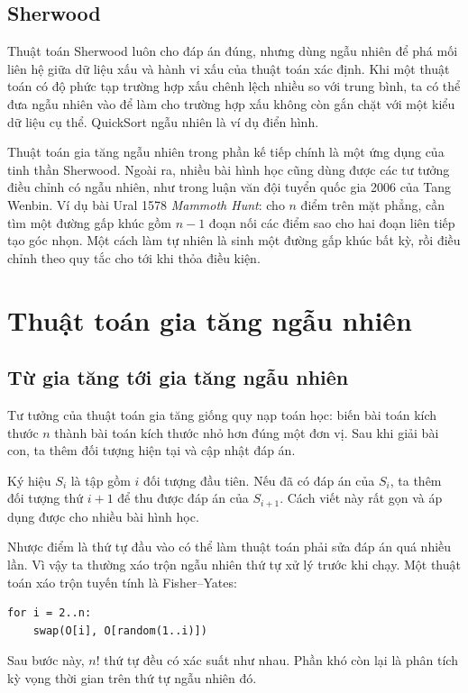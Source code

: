 \documentclass[11pt]{article}
\begin{document}
\subsection{Sherwood}

Thuật toán Sherwood luôn cho đáp án đúng, nhưng dùng ngẫu nhiên để phá mối
liên hệ giữa dữ liệu xấu và hành vi xấu của thuật toán xác định. Khi một thuật
toán có độ phức tạp trường hợp xấu chênh lệch nhiều so với trung bình, ta có
thể đưa ngẫu nhiên vào để làm cho trường hợp xấu không còn gắn chặt với một
kiểu dữ liệu cụ thể. QuickSort ngẫu nhiên là ví dụ điển hình.

Thuật toán gia tăng ngẫu nhiên trong phần kế tiếp chính là một ứng dụng của
tinh thần Sherwood. Ngoài ra, nhiều bài hình học cũng dùng được các tư tưởng
điều chỉnh có ngẫu nhiên, như trong luận văn đội tuyển quốc gia 2006 của Tang
Wenbin. Ví dụ bài Ural 1578 \textit{Mammoth Hunt}: cho \(n\) điểm trên mặt
phẳng, cần tìm một đường gấp khúc gồm \(n-1\) đoạn nối các điểm sao cho hai
đoạn liên tiếp tạo góc nhọn. Một cách làm tự nhiên là sinh một đường gấp khúc
bất kỳ, rồi điều chỉnh theo quy tắc cho tới khi thỏa điều kiện.

\section{Thuật toán gia tăng ngẫu nhiên}

\subsection{Từ gia tăng tới gia tăng ngẫu nhiên}

Tư tưởng của thuật toán gia tăng giống quy nạp toán học: biến bài toán kích
thước \(n\) thành bài toán kích thước nhỏ hơn đúng một đơn vị. Sau khi giải
bài con, ta thêm đối tượng hiện tại và cập nhật đáp án.

Ký hiệu \(S_i\) là tập gồm \(i\) đối tượng đầu tiên. Nếu đã có đáp án của
\(S_i\), ta thêm đối tượng thứ \(i+1\) để thu được đáp án của \(S_{i+1}\).
Cách viết này rất gọn và áp dụng được cho nhiều bài hình học.

Nhược điểm là thứ tự đầu vào có thể làm thuật toán phải sửa đáp án quá nhiều
lần. Vì vậy ta thường xáo trộn ngẫu nhiên thứ tự xử lý trước khi chạy. Một
thuật toán xáo trộn tuyến tính là Fisher--Yates:
\begin{verbatim}
for i = 2..n:
    swap(O[i], O[random(1..i)])
\end{verbatim}
Sau bước này, \(n!\) thứ tự đều có xác suất như nhau. Phần khó còn lại là phân
tích kỳ vọng thời gian trên thứ tự ngẫu nhiên đó.
\end{document}
